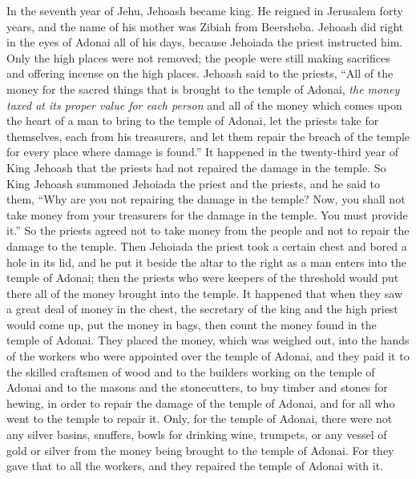 \begin{biblechapter} %
 In the seventh year of Jehu, Jehoash became king. He reigned in Jerusalem forty years, and the name of his mother was Zibiah from Beersheba.
\verse Jehoash did right in the eyes of Adonai all of his days, because Jehoiada the priest instructed him.
\verse Only the high places were not removed; the people were still making sacrifices and offering incense on the high places.
 Jehoash said to the priests, “All of the money for the sacred things that is brought to the temple of Adonai, \textit{the money taxed at its proper value for each person} and all of the money which comes upon the heart of a man to bring to the temple of Adonai,
\verse let the priests take for themselves, each from his treasurers, and let them repair the breach of the temple for every place where damage is found.”
\verse It happened in the twenty-third year of King Jehoash that the priests had not repaired the damage in the temple.
\verse So King Jehoash summoned Jehoiada the priest and the priests, and he said to them, “Why are you not repairing the damage in the temple? Now, you shall not take money from your treasurers for the damage in the temple. You must provide it.”
\verse So the priests agreed not to take money from the people and not to repair the damage to the temple.
\verse Then Jehoiada the priest took a certain chest and bored a hole in its lid, and he put it beside the altar to the right as a man enters into the temple of Adonai; then the priests who were keepers of the threshold would put there all of the money brought into the temple.
\verse It happened that when they saw a great deal of money in the chest, the secretary of the king and the high priest would come up, put the money in bags, then count the money found in the temple of Adonai.
\verse They placed the money, which was weighed out, into the hands of the workers who were appointed over the temple of Adonai, and they paid it to the skilled craftsmen of wood and to the builders working on the temple of Adonai
\verse and to the masons and the stonecutters, to buy timber and stones for hewing, in order to repair the damage of the temple of Adonai, and for all who went to the temple to repair it.
\verse Only, for the temple of Adonai, there were not any silver basins, snuffers, bowls for drinking wine, trumpets, or any vessel of gold or silver from the money being brought to the temple of Adonai.
\verse For they gave that to all the workers, and they repaired the temple of Adonai with it.

\end{biblechapter}
